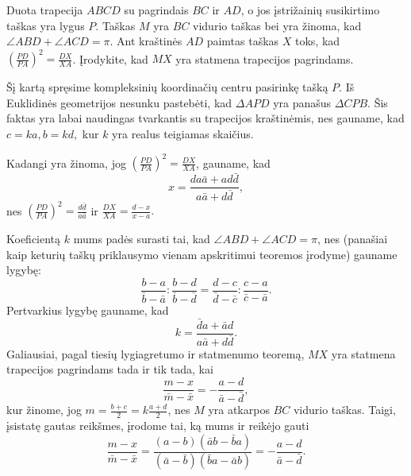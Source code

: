 \documentclass[11pt,a4paper,twoside]{book}
\begin{document}
\begin{pavnr}
Duota trapecija $ABCD$ su pagrindais $BC$ ir $AD$, o jos įstrižainių susikirtimo taškas yra lygus $P$. Taškas $M$ yra $BC$ vidurio taškas bei yra žinoma, kad $\angle ABD + \angle ACD = \pi.$ Ant kraštinės $AD$ paimtas taškas $X$ toks, kad $(\frac {PD}{PA})^2 = \frac {DX}{XA}$. Įrodykite, kad $MX$ yra statmena trapecijos pagrindams.
\end{pavnr}

\begin{sprendimas}
Šį kartą spręsime kompleksinių koordinačių centru pasirinkę tašką $P$. Iš Euklidinės geometrijos
nesunku pastebėti, kad $\Delta APD$ yra panašus $\Delta CPB$. Šis faktas yra labai naudingas tvarkantis su trapecijos kraštinėmis, nes gauname, kad $c=ka,  b=kd,$ kur $k$ yra realus teigiamas skaičius.

Kadangi yra žinoma, jog $ ( \frac {PD}{PA})^2 = \frac {DX}{XA} $, gauname, kad 
$$ x = \frac { da \bar a + ad \bar d }{ a \bar a + d \bar d},$$
nes $ ( \frac {PD}{PA})^2 =\frac {d \bar d} {a \bar a} $ ir $\frac {DX}{XA} = \frac{d-x}{x-a}.$

Koeficientą $k$ mums padės surasti tai, kad $ \angle ABD + \angle ACD = \pi $, nes (panašiai kaip keturių taškų priklausymo vienam apskritimui teoremos įrodyme) gauname lygybę:
$$\frac {b-a}{\bar b - \bar a} : \frac { b-d}{\bar b - \bar d} =  \frac {d-c}{\bar d - \bar c} : \frac { c-a}{\bar c- \bar a}.$$
Pertvarkius lygybę gauname, kad 
$$ k =  \frac { \bar d a + \bar a d }{a \bar a + d \bar d}. $$
Galiausiai, pagal tiesių lygiagretumo ir statmenumo teoremą, $MX$ yra statmena trapecijos pagrindams tada ir tik tada, kai
 $$  \frac {m-x}{ \bar m - \bar x} = - \frac {a - d}{ \bar a - \bar d},$$
kur žinome, jog $ m =\frac{b+c}{2}= k \frac { a+d} { 2} $, nes $M$ yra atkarpos $BC$ vidurio taškas. Taigi, įsistatę gautas reikšmes, įrodome tai, ką mums ir reikėjo gauti
$$ \frac {m-x}{ \bar m - \bar x}= 
\frac {(a-b)( \bar a b - \bar b a) }{(\bar a- \bar b)( \bar b a - \bar a b) } = - \frac {a - d}{ \bar a - \bar d}.$$
\end{sprendimas}
\end{document}
